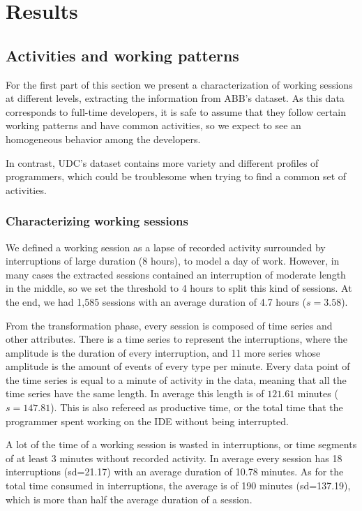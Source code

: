 \chapter{Results}
\label{ch:intro}

\section{Activities and working patterns}
For the first part of this section we present a characterization of working sessions at different levels, extracting the information from ABB's dataset. As this data corresponds to full-time developers, it is safe to assume that they follow certain working patterns and have common activities, so we expect to see an homogeneous behavior among the developers.

In contrast, UDC's dataset contains more variety and different profiles of programmers, which could be troublesome when trying to find a common set of activities.

\subsection{Characterizing working sessions}
We defined a working session as a lapse of recorded activity surrounded by interruptions of large duration (8 hours), to model a day of work. However, in many cases the extracted sessions contained an interruption of moderate length in the middle, so we set the threshold to 4 hours to split this kind of sessions. At the end, we had 1,585 sessions with an average duration of 4.7 hours ($s=3.58$).

From the transformation phase, every session is composed of time series and other attributes. There is a time series to represent the interruptions, where the amplitude is the duration of every interruption, and 11 more series whose amplitude is the amount of events of every type per minute. Every data point of the time series is equal to a minute of activity in the data, meaning that all the time series have the same length. In average this length is of $121.61$ minutes ($s=147.81$). This is also refereed as productive time, or the total time that the programmer spent working on the IDE without being interrupted.

A lot of the time of a working session is wasted in interruptions, or time segments of at least 3 minutes without recorded activity. In average every session has 18 interruptions (sd=21.17) with an average duration of 10.78 minutes. As for the total time consumed in interruptions, the average is of 190 minutes (sd=137.19), which is more than half the average duration of a session.

